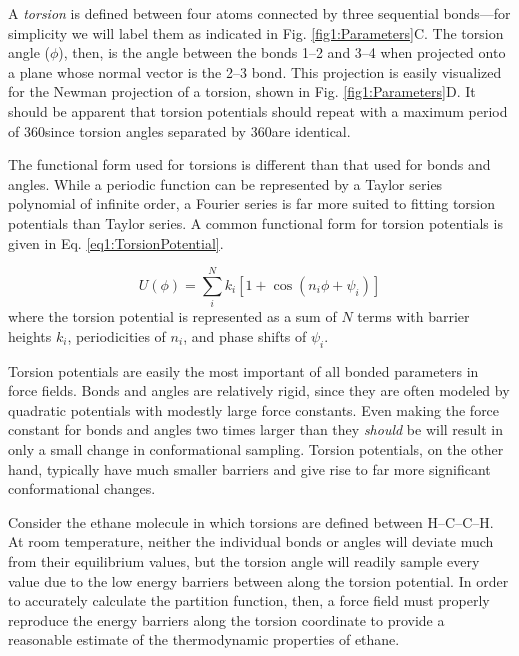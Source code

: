 A \emph{torsion} is defined between four atoms connected by three sequential
bonds---for simplicity we will label them as indicated in Fig.
\ref{fig1:Parameters}C. The torsion angle ($\phi$), then, is the angle between
the bonds 1--2 and 3--4 when projected onto a plane whose normal vector is the
2--3 bond.  This projection is easily visualized for the Newman projection of a
torsion, shown in Fig. \ref{fig1:Parameters}D. It should be apparent that
torsion potentials should repeat with a maximum period of 360\textdegree since
torsion angles separated by 360\textdegree are identical.

The functional form used for torsions is different than that used for bonds and
angles. While a periodic function can be represented by a Taylor series
polynomial of infinite order, a Fourier series is far more suited to fitting
torsion potentials than Taylor series. A common functional form for torsion
potentials is given in Eq. \ref{eq1:TorsionPotential}.
\cite{Cramer_Book_EssentialsCompChem_2004}

\begin{equation}
   U(\phi) = \sum_i^N k _ i \left [ 1 + \cos \left ( n_i \phi + \psi _ i \right )
             \right ]
   \label{eq1:TorsionPotential}
\end{equation}
where the torsion potential is represented as a sum of $N$ terms with barrier
heights $k_i$, periodicities of $n_i$, and phase shifts of $\psi _ i$.

Torsion potentials are easily the most important of all bonded parameters in
force fields. Bonds and angles are relatively rigid, since they are often
modeled by quadratic potentials with modestly large force constants. Even making
the force constant for bonds and angles two times larger than they \emph{should}
be will result in only a small change in conformational sampling. Torsion
potentials, on the other hand, typically have much smaller barriers and give
rise to far more significant conformational changes.

Consider the ethane molecule in which torsions are defined between H--C--C--H.
At room temperature, neither the individual bonds or angles will deviate much
from their equilibrium values, but the torsion angle will readily sample every
value due to the low energy barriers between along the torsion potential. In
order to accurately calculate the partition function, then, a force field must
properly reproduce the energy barriers along the torsion coordinate to provide a
reasonable estimate of the thermodynamic properties of ethane.

